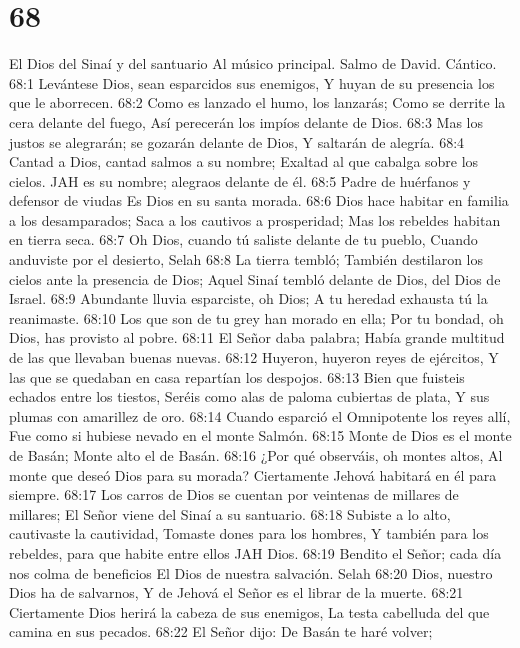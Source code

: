 \chapter{68}

El Dios del Sinaí y del santuario 
Al músico principal. Salmo de David. Cántico. 

68:1 Levántese Dios, sean esparcidos sus enemigos, 
Y huyan de su presencia los que le aborrecen. 
68:2 Como es lanzado el humo, los lanzarás; 
Como se derrite la cera delante del fuego, 
Así perecerán los impíos delante de Dios. 
68:3 Mas los justos se alegrarán; se gozarán delante de Dios, 
Y saltarán de alegría. 
68:4 Cantad a Dios, cantad salmos a su nombre; 
Exaltad al que cabalga sobre los cielos. 
JAH es su nombre; alegraos delante de él. 
68:5 Padre de huérfanos y defensor de viudas 
Es Dios en su santa morada. 
68:6 Dios hace habitar en familia a los desamparados; 
Saca a los cautivos a prosperidad; 
Mas los rebeldes habitan en tierra seca. 
68:7 Oh Dios, cuando tú saliste delante de tu pueblo, 
Cuando anduviste por el desierto, Selah 
68:8 La tierra tembló; 
También destilaron los cielos ante la presencia de Dios; 
Aquel Sinaí tembló delante de Dios, del Dios de Israel. 
68:9 Abundante lluvia esparciste, oh Dios; 
A tu heredad exhausta tú la reanimaste. 
68:10 Los que son de tu grey han morado en ella; 
Por tu bondad, oh Dios, has provisto al pobre. 
68:11 El Señor daba palabra; 
Había grande multitud de las que llevaban buenas nuevas. 
68:12 Huyeron, huyeron reyes de ejércitos, 
Y las que se quedaban en casa repartían los despojos. 
68:13 Bien que fuisteis echados entre los tiestos, 
Seréis como alas de paloma cubiertas de plata, 
Y sus plumas con amarillez de oro. 
68:14 Cuando esparció el Omnipotente los reyes allí, 
Fue como si hubiese nevado en el monte Salmón. 
68:15 Monte de Dios es el monte de Basán; 
Monte alto el de Basán. 
68:16 ¿Por qué observáis, oh montes altos, 
Al monte que deseó Dios para su morada? 
Ciertamente Jehová habitará en él para siempre. 
68:17 Los carros de Dios se cuentan por veintenas de millares de millares; 
El Señor viene del Sinaí a su santuario. 
68:18 Subiste a lo alto, cautivaste la cautividad, 
Tomaste dones para los hombres, 
Y también para los rebeldes, para que habite entre ellos JAH Dios. 
68:19 Bendito el Señor; cada día nos colma de beneficios 
El Dios de nuestra salvación. Selah 
68:20 Dios, nuestro Dios ha de salvarnos, 
Y de Jehová el Señor es el librar de la muerte. 
68:21 Ciertamente Dios herirá la cabeza de sus enemigos, 
La testa cabelluda del que camina en sus pecados. 
68:22 El Señor dijo: De Basán te haré volver; 
